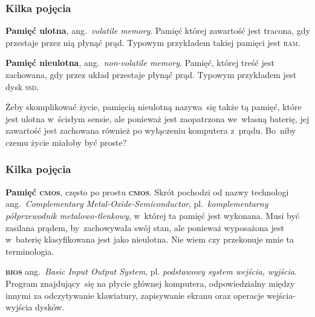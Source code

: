 \documentclass[10pt,t]{beamer}
\begin{document}
\begin{frame}
  \frametitle{Kilka pojęcia}


  \textbf{Pamięć ulotna}, ang.~\textit{volatile memory}. Pamięć której
  zawartość jest tracona, gdy przestaje przez nią płynąć prąd. Typowym
  przykładem takiej pamięci jest \textsc{ram}.

  \textbf{Pamięć nieulotna}, ang.~\textit{non-volatile memory}. Pamięć,
  której treść jest zachowana, gdy przez układ przestaje płynąć prąd.
  Typowym przykładem jest dysk \textsc{ssd}.

  Żeby skomplikować życie, pamięcią nieulotną nazywa~się także tą pamięć,
  które jest ulotna w~ścisłym sensie, ale ponieważ jest zaopatrzona
  we~własną baterię, jej zawartość jest zachowana również po wyłączeniu
  komputera z~prądu. Bo~niby czemu życie miałoby być proste?

\end{frame}





\begin{frame}
  \frametitle{Kilka pojęcia}


  \textbf{Pamięć \textsc{cmos}}, często po prostu \textbf{\textsc{cmos}}.
  Skrót pochodzi od nazwy technologi ang.~\textit{Complementary
    Metal-Oxide-Semiconductor}, pl.~\textit{komplementarny półprzewodnik
    metalowo-tlenkowy}, w~której ta pamięć jest wykonana. Musi być zasilana
  prądem, by~zachowywała swój stan, ale ponieważ wyposażona jest w~baterię
  klasyfikowana jest jako nieulotna. Nie wiem czy przekonuje mnie ta
  terminologia.

  \textbf{\textsc{bios}} ang.~\textit{Basic Input Output System}, pl.
  \textit{podstawowy system wejścia, wyjścia}. Program znajdujący~się
  na płycie głównej komputera, odpowiedzialny między innymi za odczytywanie
  klawiatury, zapisywanie ekranu oraz operacje wejścia-wyjścia dysków.

\end{frame}
\end{document}
